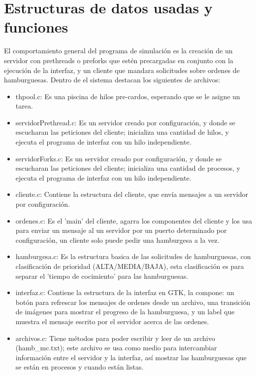 \documentclass{article}
\begin{document}
\section{Estructuras de datos usadas y funciones}
El comportamiento general del programa de simulación es la creación de un servidor con prethreads o preforks  que estén precargadas en conjunto con la ejecución de la interfaz, y un cliente que mandara solicitudes sobre ordenes de hamburguesas.  Dentro de el sistema destacan los siguientes de archivos:
    \begin{itemize}
        \item thpool.c: Es una piscina de hilos pre-cardos, esperando que se le asigne un tarea.
        \item servidorPrethread.c: Es un servidor creado por configuración, y donde se escucharan las peticiones del cliente; inicializa una cantidad de hilos, y ejecuta el programa de interfaz con un hilo independiente.
        \item servidorForks.c: Es un servidor creado por configuración, y donde se escucharan las peticiones del cliente; inicializa una cantidad de procesos, y ejecuta el programa de interfaz con un hilo independiente.
        \item cliente.c: Contiene la estructura del cliente, que envía mensajes a un servidor por configuración.
        \item ordenes.c: Es el 'main' del cliente, agarra los componentes del cliente y los usa para enviar un mensaje al un servidor por un puerto determinado por configuración, un cliente solo puede pedir una hamburgesa a la vez.
        \item hamburgesa.c: Es la estructura basica de las solicitudes de hamburguesas, con clasificación de prioridad (ALTA/MEDIA/BAJA), esta clasificación es para separar el 'tiempo de cocimiento' para las hamburguesas.
        \item interfaz.c: Contiene la estructura de la interfaz en GTK, la compone: un botón para refrescar los mensajes de ordenes desde un archivo, una transición de imágenes para mostrar el progreso de la hamburguesa, y un label que muestra el mensaje escrito por el servidor acerca de las ordenes.
        \item archivos.c: Tiene métodos para poder escribir y leer de un archivo (hamb\_mc.txt); este archivo se usa como medio para intercambiar información entre el servidor y la interfaz, así mostrar las hamburguesas que se están en procesos y cuando están listas.
        
    \end{itemize}
\end{document}
